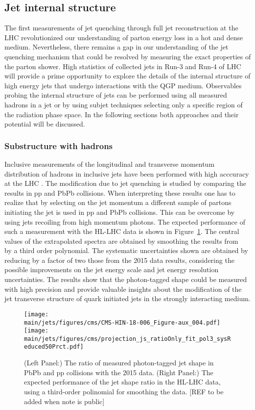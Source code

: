 \subsection{Jet internal structure}
The first measurements of jet quenching through full jet reconstruction at the LHC revolutionized our understanding of parton energy loss in a hot and dense medium. Nevertheless, there remains a gap in our understanding of the jet quenching mechanism that could be resolved by measuring the exact properties of the parton shower. High statistics of collected jets in Run-3 and Run-4 of LHC will provide a prime opportunity to explore the details of the internal structure of high energy jets that undergo interactions with the QGP medium. Observables probing the internal structure of jets can be performed using all measured hadrons in a jet or by using subjet techniques selecting only a specific region of the radiation phase space. In the following sections both approaches and their potential will be discussed.

\subsubsection{Substructure with hadrons}
Inclusive measurements of the longitudinal and transverse momentum distribution of hadrons in inclusive jets have been performed with high acccuracy at the LHC \cite{Aaboud:2018hpb,Sirunyan:2018jqr}. The modification due to jet quenching is studied by comparing the results in pp and PbPb collisions. When interpreting these results one has to realize that by selecting on the jet momentum a different sample of partons initiating the jet is used in pp and PbPb collisions. This can be overcome by using jets recoiling from high momentum photons. The expected performance of such a measurement with the HL-LHC data is shown in Figure~\ref{fig:jetshape}. The central values of the extrapolated spectra are obtained by smoothing the results from~\cite{Sirunyan:2018ncy} by a third order polynomial. The systematic uncertainties shown are obtained by reducing by a factor of two those from the 2015 data results, considering the possible improvements on the jet energy scale and jet energy resolution uncertainties. The results show that the photon-tagged shape could be measured with high precision and provide valuable insights about the modification of the jet transverse structure of quark initiated jets in the strongly interacting medium.
%
\begin{figure}[!ht]
\begin{center}
\texttt{[image: \\main/jets/figures/cms/CMS-HIN-18-006\_Figure-aux\_004.pdf]}
\texttt{[image: \\main/jets/figures/cms/projection\_js\_ratioOnly\_fit\_pol3\_sysReduced50Prct.pdf]}
\caption{(Left Panel:) The ratio of measured photon-tagged jet shape in PbPb and pp collisions with the 2015 data. (Right Panel:) The expected performance of the jet shape ratio in the HL-LHC data, using a third-order polinomial for smoothing the data. [REF to be added when note is public]}
\label{fig:jetshape}
\end{center}
\end{figure}

